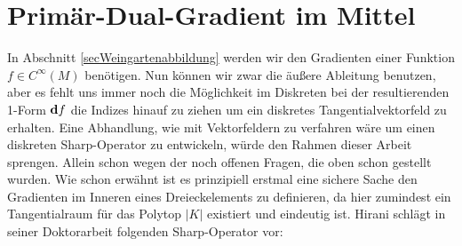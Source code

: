 \pagebreak
\section{Primär-Dual-Gradient im Mittel}

  In Abschnitt \ref{secWeingartenabbildung} werden wir den Gradienten einer Funktion \( f\in C^{\infty}(M) \) benötigen.
  Nun können wir zwar die äußere Ableitung benutzen, aber es fehlt uns immer noch die Möglichkeit im Diskreten bei der resultierenden 
  1-Form \( \mathbf{d} f \) die Indizes hinauf zu ziehen um ein diskretes Tangentialvektorfeld zu erhalten.
  Eine Abhandlung, wie mit Vektorfeldern zu verfahren wäre um einen diskreten Sharp-Operator zu entwickeln, würde den Rahmen dieser Arbeit
  sprengen. Allein schon wegen der noch offenen Fragen, die oben schon gestellt wurden.
  Wie schon erwähnt ist es prinzipiell erstmal eine sichere Sache den Gradienten im Inneren eines Dreieckelements zu definieren, da hier
  zumindest ein Tangentialraum für das Polytop \( |K| \) existiert und eindeutig ist.
  Hirani schlägt in seiner Doktorarbeit \cite{hirani} folgenden Sharp-Operator vor:
  
